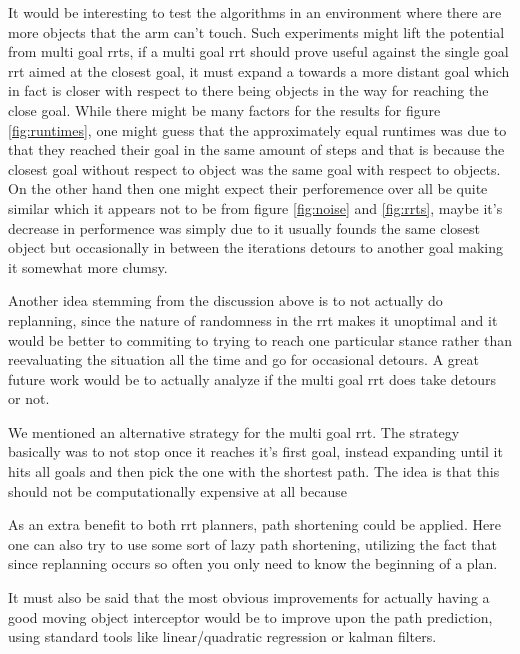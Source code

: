 \documentclass[letterpaper, 10 pt, conference]{ieeeconf}  %
\begin{document}
It would be interesting to test the algorithms in an environment where
there are more objects that the arm can't touch. Such experiments might
lift the potential from multi goal rrts,  if a multi goal rrt should
prove useful against the single goal rrt aimed at the closest goal, it
must expand a towards a more distant goal which in fact is closer with
respect to there being objects in the way for reaching the close goal.
While there might be many factors for the results for figure
\ref{fig:runtimes}, one might guess that the approximately equal
runtimes was due to that they reached their goal in the same amount of
steps and that is because the closest goal without respect to object was
the same goal with respect to objects. On the other hand then one might
expect their perforemence over all be quite similar which it appears not
to be from figure \ref{fig:noise} and \ref{fig:rrts}, maybe it's
decrease in performence was simply due to it usually founds the same
closest object but occasionally in between the iterations detours to
another goal making it somewhat more clumsy.

Another idea stemming from the discussion above is to not actually do
replanning, since the nature of randomness in the rrt makes it unoptimal
and it would be better to commiting to trying to reach one particular
stance rather than reevaluating the situation all the time and go for
occasional detours. A great future work would be to actually analyze if
the multi goal rrt does take detours or not.

We mentioned an alternative strategy for the multi goal rrt.  The strategy
basically was to not stop once it reaches it's first goal, instead
expanding until it hits all goals and then pick the one with the
shortest path. The idea is that this should not be computationally
expensive at all because

As an extra benefit to both rrt planners, path shortening could be
applied. Here one can also try to use some sort of lazy path shortening,
utilizing the fact that since replanning occurs so often you only need
to know the beginning of a plan.

It must also be said that the most obvious improvements for actually
having a good moving object interceptor would be to improve upon the
path prediction, using standard tools like linear/quadratic regression
or kalman filters.



\end{document}
